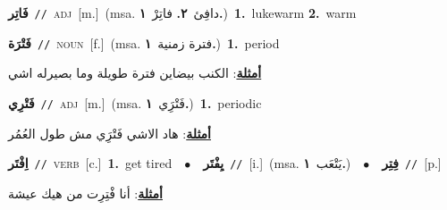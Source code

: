 \documentclass[10pt,a4paper,twoside]{article} %
\begin{document}
\begin{multicols}{2}
{{{{\setlength\topsep{0pt}\textbf{\foreignlanguage{arabic}{فَاتِر}}\ {\color{gray}\texttt{//}\color{black}}\ \textsc{adj}\ [m.]\ \color{gray}(msa. \foreignlanguage{arabic}{دافِئ}~\foreignlanguage{arabic}{\textbf{٢.}}  \foreignlanguage{arabic}{فاتِرْ}~\foreignlanguage{arabic}{\textbf{١.}})\color{black}\ \textbf{1.}~lukewarm  \textbf{2.}~warm\ 

{\setlength\topsep{0pt}\textbf{\foreignlanguage{arabic}{فَتْرَة}}\ {\color{gray}\texttt{//}\color{black}}\ \textsc{noun}\ [f.]\ \color{gray}(msa. \foreignlanguage{arabic}{فترة زمنية}~\foreignlanguage{arabic}{\textbf{١.}})\color{black}\ \textbf{1.}~period\  \begin{flushright}\color{gray}\foreignlanguage{arabic}{\textbf{\underline{\foreignlanguage{arabic}{أمثلة}}}: الكنب بيضاين فترة طويلة وما بصيرله اشي}\end{flushright}\color{black}} \vspace{2mm}

{\setlength\topsep{0pt}\textbf{\foreignlanguage{arabic}{فَتْرِي}}\ {\color{gray}\texttt{//}\color{black}}\ \textsc{adj}\ [m.]\ \color{gray}(msa. \foreignlanguage{arabic}{فَتْرَِي}~\foreignlanguage{arabic}{\textbf{١.}})\color{black}\ \textbf{1.}~periodic\  \begin{flushright}\color{gray}\foreignlanguage{arabic}{\textbf{\underline{\foreignlanguage{arabic}{أمثلة}}}: هاد الاشي فَتْرَِي مش طول العُمُر}\end{flushright}\color{black}} \vspace{2mm}

{\setlength\topsep{0pt}\textbf{\foreignlanguage{arabic}{اِفْتَر}}\ {\color{gray}\texttt{//}\color{black}}\ \textsc{verb}\ [c.]\ \textbf{1.}~get tired\ \ $\bullet$\ \ \setlength\topsep{0pt}\textbf{\foreignlanguage{arabic}{يِفْتَر}}\ {\color{gray}\texttt{//}\color{black}}\ [i.]\ \color{gray}(msa. \foreignlanguage{arabic}{يَتْعَب}~\foreignlanguage{arabic}{\textbf{١.}})\color{black}\ \ $\bullet$\ \ \setlength\topsep{0pt}\textbf{\foreignlanguage{arabic}{فِتِر}}\ {\color{gray}\texttt{//}\color{black}}\ [p.]\  \begin{flushright}\color{gray}\foreignlanguage{arabic}{\textbf{\underline{\foreignlanguage{arabic}{أمثلة}}}: أنا فْتِرِت من هيك عيشة}\end{flushright}\color{black}} \vspace{2mm}

}}}}
\end{multicols}
\end{document}
